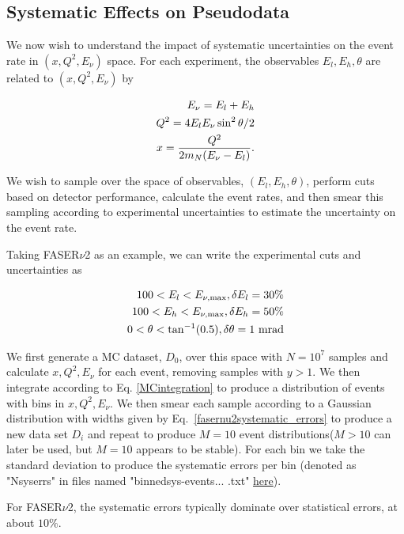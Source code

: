 \documentclass[11pt,a4paper]{article}
\def\frac#1#2{{{#1}\over {#2}}}
\numberwithin{equation}{section}
\numberwithin{figure}{section}
\numberwithin{table}{section}
\begin{document}
\subsection{Systematic Effects on Pseudodata}
We now wish to understand the impact of systematic uncertainties on the event rate in $(x,Q^2,E_{\nu})$ space. For each experiment, the observables $E_{l},E_{h},\theta$ are related to $(x,Q^2,E_{\nu})$ by 

\begin{align}
E_{\nu} = E_l + E_h \nonumber \\
Q^2 = 4E_lE_{\nu}\sin^2{\theta/2} \nonumber \\
x = \frac{Q^2}{2m_N(E_{\nu} - E_l)}.
\end{align}

We wish to sample over the space of observables, $(E_{l},E_{h},\theta)$, perform  cuts based on detector performance, calculate the event rates, and then smear this sampling according to experimental uncertainties to estimate the uncertainty on the event rate. 

Taking FASER${\nu}$2 as an example, we can write the experimental cuts and uncertainties as 

\begin{align}
100 < E_l < E_{\nu,{\rm max}} , \delta E_l = 30\% \nonumber \\
100 < E_h < E_{\nu,{\rm max}} , \delta E_h = 50\% \nonumber \\
0 < \theta < \tan^{-1}(0.5) , \delta\theta = 1~{\rm mrad}
\label{fasernu2systematic_errors}
\end{align}

We first generate a MC dataset, $D_0$, over this space with $N = 10^7$ samples and calculate $x,Q^2,E_{\nu}$ for each event, removing samples with $y > 1$. We then integrate according to Eq. \ref{MCintegration} to produce a distribution of events with bins in $x,Q^2,E_{\nu}$. We then smear each sample according to a Gaussian distribution with widths given by Eq.~\ref{fasernu2systematic_errors} to produce a new data set $D_i$ and repeat to produce $M = 10$ event distributions($M>10$ can later be used, but $M = 10$ appears to be stable). For each bin we take the standard deviation to produce the systematic errors per bin (denoted as "N\textunderscore sys\textunderscore errs" in files named "binned\textunderscore sys-events... .txt" \href{https://github.com/juanrojochacon/FPF-WG1/tree/main/results}{here}). 

For FASER${\nu}$2, the systematic errors typically dominate over statistical errors, at about $10\%$. 
\end{document}
